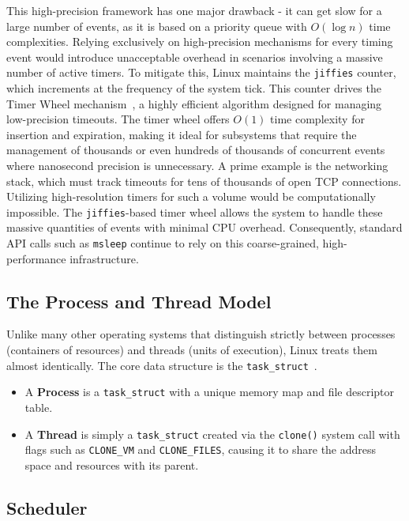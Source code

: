 \documentclass[a4paper,10pt,twoside]{report}
\theoremstyle{definition}
\begin{document}
This high-precision framework has one major drawback - it can get slow for a large number of events, as it is based on a priority queue with $O(\log n)$ time complexities. Relying exclusively on high-precision mechanisms for every timing event would introduce unacceptable overhead in scenarios involving a massive number of active timers. To mitigate this, Linux maintains the \texttt{jiffies} counter, which increments at the frequency of the system tick. This counter drives the Timer Wheel mechanism~\cite{linux_timer_wheel}, a highly efficient algorithm designed for managing low-precision timeouts. The timer wheel offers $O(1)$ time complexity for insertion and expiration, making it ideal for subsystems that require the management of thousands or even hundreds of thousands of concurrent events where nanosecond precision is unnecessary. A prime example is the networking stack, which must track timeouts for tens of thousands of open TCP connections. Utilizing high-resolution timers for such a volume would be computationally impossible. The \texttt{jiffies}-based timer wheel allows the system to handle these massive quantities of events with minimal CPU overhead. Consequently, standard API calls such as \texttt{msleep} continue to rely on this coarse-grained, high-performance infrastructure.

\subsection{The Process and Thread Model}
\label{subsec:linux-task}

Unlike many other operating systems that distinguish strictly between processes (containers of resources) and threads (units of execution), Linux treats them almost identically. The core data structure is the \texttt{task\_struct}~\cite{linux_task, bovet2005understanding}.
\begin{itemize}
    \item A \textbf{Process} is a \texttt{task\_struct} with a unique memory map and file descriptor table.
    \item A \textbf{Thread} is simply a \texttt{task\_struct} created via the \texttt{clone()} system call with flags such as \texttt{CLONE\_VM} and \texttt{CLONE\_FILES}, causing it to share the address space and resources with its parent.
\end{itemize}

\subsection{Scheduler}
\label{subsec:linux-scheduler}
\end{document}
